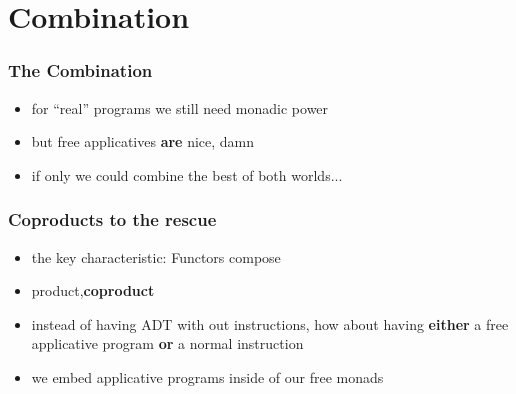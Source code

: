 \documentclass[compress]{beamer}
\begin{document}
\section{Combination}

\begin{frame}
  \frametitle{The Combination}
  \begin{itemize}
  \item for ``real'' programs we still need monadic power
  \item but free applicatives \textbf{are} nice, damn
  \item if only we could combine the best of both worlds...
  \end{itemize}
\end{frame}

\begin{frame}
  \frametitle{Coproducts to the rescue}
  \begin{itemize}
  \item the key characteristic: Functors compose
  \item product,\textbf{coproduct}
  \item instead of having ADT with out instructions, how about having
    \textbf{either} a free applicative program \textbf{or} a normal
    instruction
  \item we embed applicative programs inside of our free monads
  \end{itemize}
\end{frame}
\end{document}

